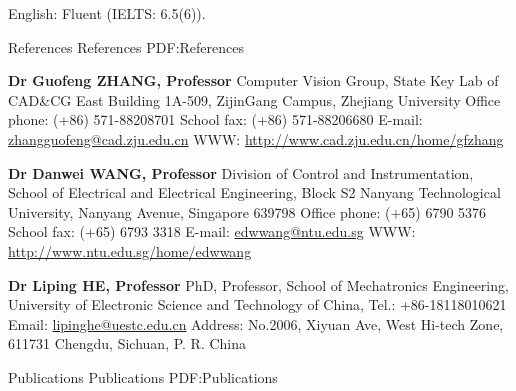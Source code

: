 \documentclass[letterpaper,MMMyyyy,nonstopmode]{simpleresumecv}
\begin{document}
\begin{Body}
\Gap
\BulletItem
English: Fluent (IELTS: 6.5(6)).



\Section
{References}
{References}
{PDF:References}

\BulletItem
\textbf{Dr Guofeng ZHANG, Professor}
\newline
Computer Vision Group, State Key Lab of CAD\&CG
\newline
East Building 1A-509, ZijinGang Campus, Zhejiang University
\newline
Office phone: (+86) 571-88208701
\newline
School fax: (+86) 571-88206680
\newline
E-mail: \url{zhangguofeng@cad.zju.edu.cn}
\newline
WWW: \url{http://www.cad.zju.edu.cn/home/gfzhang}

\Gap
\BulletItem
\textbf{Dr Danwei WANG, Professor}
\newline
Division of Control and Instrumentation,
School of Electrical and Electrical Engineering, Block S2
\newline
Nanyang Technological University,
Nanyang Avenue, Singapore 639798
\newline
Office phone: (+65) 6790 5376
\newline
School fax: (+65) 6793 3318
\newline
E-mail: \url{edwwang@ntu.edu.sg}
\newline
WWW: \url{http://www.ntu.edu.sg/home/edwwang}

\Gap
\BulletItem
\textbf{Dr Liping HE, Professor}
\newline
PhD, Professor, School of Mechatronics Engineering,
\newline
University of Electronic Science and Technology of China,
\newline
Tel.: +86-18118010621
\newline
Email: \url{lipinghe@uestc.edu.cn}
\newline
Address: No.2006, Xiyuan Ave, West Hi-tech Zone, 611731 Chengdu, Sichuan, P. R. China


\Section
{Publications}
{Publications}
{PDF:Publications}

\begingroup
\renewcommand{\MaxNumberedItem}{[88]}

\nocite{*}



\endgroup













\end{Body}


\UseNoteFont%
\null\hfill%
\end{document}
